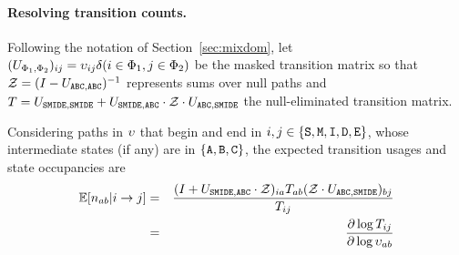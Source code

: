 \paragraph{Resolving transition counts.}
Following the notation of Section~\ref{sec:mixdom},
let $(U_{\Phi_1,\Phi_2})_{ij} = \upsilon_{ij} \delta(i \in \Phi_1, j \in \Phi_2)$ be the masked transition matrix
so that $\mathcal{Z} = (I - U_{{\tt A}{\tt B}{\tt C},{\tt A}{\tt B}{\tt C}})^{-1}$ represents sums over null paths
and $T = U_{{\tt S}{\tt M}{\tt I}{\tt D}{\tt E},{\tt S}{\tt M}{\tt I}{\tt D}{\tt E}} + U_{{\tt S}{\tt M}{\tt I}{\tt D}{\tt E},{\tt A}{\tt B}{\tt C}} \cdot \mathcal{Z} \cdot U_{{\tt A}{\tt B}{\tt C},{\tt S}{\tt M}{\tt I}{\tt D}{\tt E}}$
the null-eliminated transition matrix.

Considering paths in $\upsilon$ that begin and end in $i,j \in \{{\tt S},{\tt M},{\tt I},{\tt D},{\tt E}\}$, whose intermediate states (if any) are in $\{ {\tt A}, {\tt B}, {\tt C} \}$,
the expected transition usages and state occupancies are
\begin{eqnarray*}
  \mathbb{E}[n_{ab}|i \to j] & = & \frac{(I + U_{{\tt S}{\tt M}{\tt I}{\tt D}{\tt E},{\tt A}{\tt B}{\tt C}} \cdot \mathcal{Z})_{ia} T_{ab} (\mathcal{Z} \cdot U_{{\tt A}{\tt B}{\tt C},{\tt S}{\tt M}{\tt I}{\tt D}{\tt E}})_{bj}}{T_{ij}} \\
  & = & \frac{\partial \log T_{ij}}{\partial \log \upsilon_{ab}}
\end{eqnarray*}

